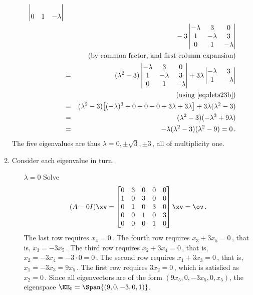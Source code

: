 \begin{example}
\begin{solution}
\begin{enumerate}
\begin{eqnarray*}
\begin{vmatrix}
\\0&1&-\lambda\end{vmatrix}
\\&&{}
-3\begin{vmatrix}-\lambda&3&0
\\1&-\lambda&3
\\0&1&-\lambda\end{vmatrix}
\\&&(\text{by common factor, and first column expansion})
\\&=&(\lambda^2-3)\begin{vmatrix}-\lambda&3&0
\\1&-\lambda&3
\\0&1&-\lambda\end{vmatrix}
+3\lambda\begin{vmatrix}-\lambda&3
\\1&-\lambda\end{vmatrix}
\\&&(\text{using~\eqref{eq:dets23b}})
\\&=&(\lambda^2-3)\big[(-\lambda)^3+0+0-0+3\lambda+3\lambda\big]
+3\lambda(\lambda^2-3)
\\&=&(\lambda^2-3)(-\lambda^3+9\lambda)
\\&=&-\lambda(\lambda^2-3)(\lambda^2-9)=0\,.
\end{eqnarray*}
The five eigenvalues are thus \(\lambda=0,\pm\sqrt3,\pm3\)\,, all of multiplicity one.

\item Consider each eigenvalue in turn.
\begin{itemize}
\item[\(\lambda=0\)]  Solve
\begin{equation*}
(A-0I)\xv=\begin{bmatrix}0&3&0&0&0
\\1&0&3&0&0
\\0&1&0&3&0
\\0&0&1&0&3
\\0&0&0&1&0\end{bmatrix}\xv=\ov\,.
\end{equation*}
The last row requires \(x_4=0\)\,.
The fourth row requires \(x_3+3x_5=0\)\,, that is, \(x_3=-3x_5\)\,.
The third row requires \(x_2+3x_4=0\)\,, that is, \(x_2=-3x_4=-3\cdot 0=0\)\,.
The second row requires \(x_1+3x_3=0\)\,, that is, \(x_1=-3x_3=9x_5\)\,.
The first row requires \(3x_2=0\)\,, which is satisfied as \(x_2=0\)\,.
Since all eigenvectors are of the form \((9x_5,0,-3x_5,0,x_5)\), the eigenspace \(\EE_0=\Span\{(9,0,-3,0,1)\}\).


\end{itemize}
\end{enumerate}
\end{solution}
\end{example}
